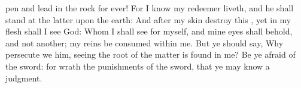 {pen and
lead in the
rock for
ever!
For I
know
{} my
redeemer
liveth, and
{} he shall
stand at the
latter
{} upon the
earth:
And
{}
after my
skin
{}
destroy this
{}, yet in my
flesh shall I
see
God:
Whom I shall
see for myself, and mine
eyes shall
behold, and not
another;
{} my
reins be
consumed
within me.
But ye should
say, Why
persecute we him, seeing the
root of the
matter is
found in me?
Be ye
afraid of the
sword: for
wrath
{} the
punishments
of the
sword, that ye may
know
{} a
judgment.

}
